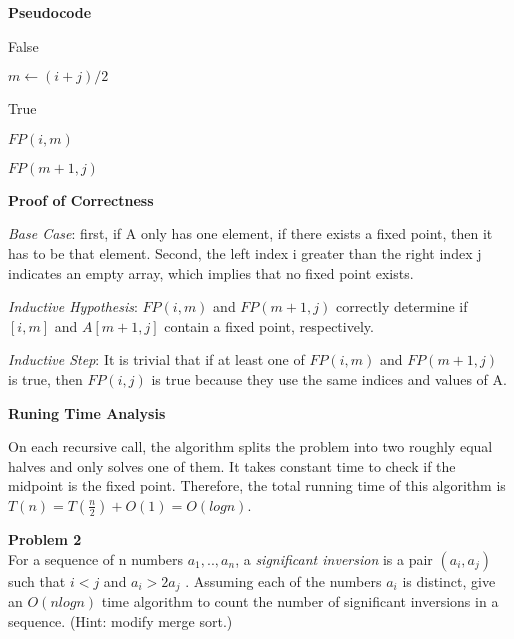 \documentclass[12pt,article]{article}
\newenvironment{problem}[2][Problem]
    { \begin{mdframed}[backgroundcolor=gray!20] \textbf{#1 #2} \\}
    {  \end{mdframed}}
\begin{document}
\textbf{Pseudocode}

\begin{algorithm}
\caption{$FP(i,j)$}\label{alg:q2}
\begin{algorithmic}

        \Return False
    \EndIf

    \State $m \gets (i+j) / 2$


        \Return True

        \Return $FP(i,m)$
    \Else

        \Return $FP(m+1,j)$
    \EndIf

\end{algorithmic}
\end{algorithm}

\textbf{Proof of Correctness}

\textit{Base Case}: first, if A only has one element, if there exists a fixed point, then it has to be that element. Second, the left index i greater than the right index j indicates an empty array, which implies that no fixed point exists.

\textit{Inductive Hypothesis}: $FP(i,m)$ and $FP(m+1,j)$ correctly determine if $[i,m]$ and $A[m+1,j]$ contain a fixed point, respectively.

\textit{Inductive Step}: It is trivial that if at least one of $FP(i,m)$ and $FP(m+1,j)$ is true, then $FP(i,j)$ is true because they use the same indices and values of A.

\textbf{Runing Time Analysis}

On each recursive call, the algorithm splits the problem into two roughly equal halves and only solves one of them. It takes constant time to check if the midpoint is the fixed point. Therefore, the total running time of this algorithm is $T(n) = T(\frac{n}{2}) + O(1) = O(logn)$.

\newpage
\begin{problem}{2} 
For a sequence of n numbers $a_1, .., a_n$, a \textit{significant inversion} is a pair $(a_i, a_j)$ such that $i < j$ and $a_i > 2a_j$ . Assuming each of the numbers $a_i$ is distinct, give an $O(nlogn)$ time algorithm to count the number of significant inversions in a sequence. (Hint: modify merge sort.)
\end{problem}
\end{document}

